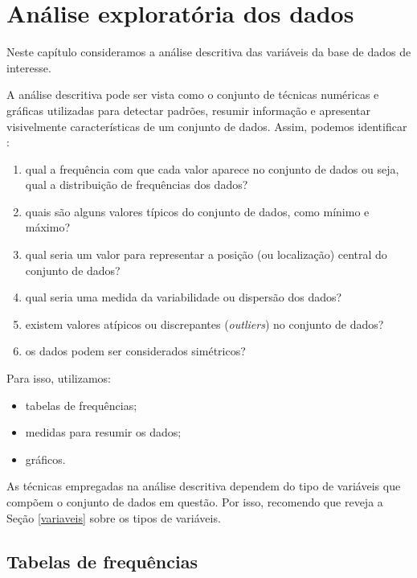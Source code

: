 \documentclass[
]{book}
\providecommand{\tightlist}{%
  \setlength{\itemsep}{0pt}\setlength{\parskip}{0pt}}
\begin{document}
\hypertarget{anuxe1lise-exploratuxf3ria-dos-dados}{%
\chapter{Análise exploratória dos dados}\label{anuxe1lise-exploratuxf3ria-dos-dados}}

Neste capítulo consideramos a análise descritiva das variáveis da base de dados de interesse.

A análise descritiva pode ser vista como o conjunto de técnicas numéricas e gráficas utilizadas para detectar padrões, resumir informação e apresentar visivelmente características de um conjunto de dados. Assim, podemos identificar \citep{morettin2020introduccaoa}:

\begin{enumerate}
\def\labelenumi{\roman{enumi})}
\item
  qual a frequência com que cada valor aparece no conjunto de dados ou seja, qual a distribuição de frequências dos
  dados?
\item
  quais são alguns valores típicos do conjunto de dados, como mínimo e máximo?
\item
  qual seria um valor para representar a posição (ou localização) central do conjunto de dados?
\item
  qual seria uma medida da variabilidade ou dispersão dos dados?
\item
  existem valores atípicos ou discrepantes (\emph{outliers}) no conjunto de dados?
\item
  os dados podem ser considerados simétricos?
\end{enumerate}

Para isso, utilizamos:

\begin{itemize}
\tightlist
\item
  tabelas de frequências;
\item
  medidas para resumir os dados;
\item
  gráficos.
\end{itemize}

As técnicas empregadas na análise descritiva dependem do tipo de variáveis que compõem o conjunto de dados em questão. Por isso, recomendo que reveja a Seção \ref{variaveis} sobre os tipos de variáveis.

\hypertarget{tabelas-de-frequuxeancias}{%
\section{Tabelas de frequências}\label{tabelas-de-frequuxeancias}}
\end{document}
